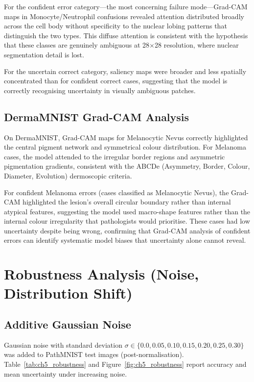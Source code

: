For the confident error category---the most concerning failure mode---Grad-CAM maps in Monocyte/Neutrophil confusions revealed attention distributed broadly across the cell body without specificity to the nuclear lobing patterns that distinguish the two types. This diffuse attention is consistent with the hypothesis that these classes are genuinely ambiguous at 28$\times$28 resolution, where nuclear segmentation detail is lost.

For the uncertain correct category, saliency maps were broader and less spatially concentrated than for confident correct cases, suggesting that the model is correctly recognising uncertainty in visually ambiguous patches.

\subsection{DermaMNIST Grad-CAM Analysis}

On DermaMNIST, Grad-CAM maps for Melanocytic Nevus correctly highlighted the central pigment network and symmetrical colour distribution. For Melanoma cases, the model attended to the irregular border regions and asymmetric pigmentation gradients, consistent with the ABCDe (Asymmetry, Border, Colour, Diameter, Evolution) dermoscopic criteria.

For confident Melanoma errors (cases classified as Melanocytic Nevus), the Grad-CAM highlighted the lesion's overall circular boundary rather than internal atypical features, suggesting the model used macro-shape features rather than the internal colour irregularity that pathologists would prioritise. These cases had low uncertainty despite being wrong, confirming that Grad-CAM analysis of confident errors can identify systematic model biases that uncertainty alone cannot reveal.

\section{Robustness Analysis (Noise, Distribution Shift)}

\subsection{Additive Gaussian Noise}

Gaussian noise with standard deviation $\sigma \in \{0.0, 0.05, 0.10, 0.15, 0.20, 0.25, 0.30\}$ was added to PathMNIST test images (post-normalisation). Table~\ref{tab:ch5_robustness} and Figure~\ref{fig:ch5_robustness} report accuracy and mean uncertainty under increasing noise.

